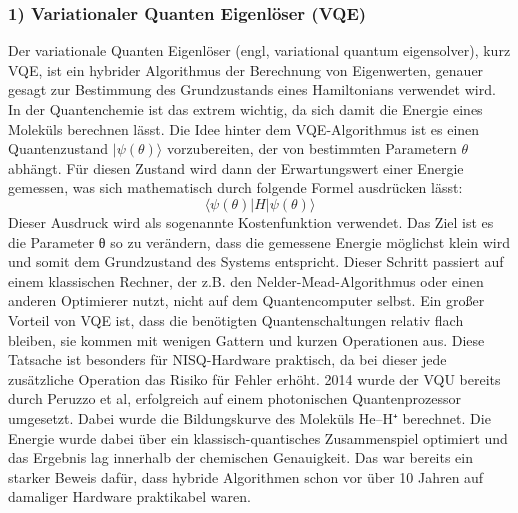\subsubsection*{1) Variationaler Quanten Eigenlöser (VQE)}
Der variationale Quanten Eigenlöser (engl, variational quantum eigensolver), kurz VQE, ist ein hybrider Algorithmus der Berechnung von Eigenwerten, genauer gesagt zur Bestimmung des Grundzustands eines Hamiltonians verwendet wird. In der Quantenchemie ist das extrem wichtig, da sich damit die Energie eines Moleküls berechnen lässt. Die Idee hinter dem VQE-Algorithmus ist es einen Quantenzustand $|\psi(\theta)\rangle$ vorzubereiten, der von bestimmten Parametern $\theta$ abhängt. Für diesen Zustand wird dann der Erwartungswert einer Energie gemessen, was sich mathematisch durch folgende Formel ausdrücken lässt:
$$
\langle\psi(\theta)|H|\psi(\theta)\rangle
$$
Dieser Ausdruck wird als sogenannte Kostenfunktion verwendet. Das Ziel ist es die Parameter θ so zu verändern, dass die gemessene Energie möglichst klein wird und somit dem Grundzustand des Systems entspricht. Dieser Schritt passiert auf einem klassischen Rechner, der z.B. den Nelder-Mead-Algorithmus oder einen anderen Optimierer nutzt, nicht auf dem Quantencomputer selbst. 
Ein großer Vorteil von VQE ist, dass die benötigten Quantenschaltungen relativ flach bleiben, sie kommen mit wenigen Gattern und kurzen Operationen aus. Diese Tatsache ist besonders für NISQ-Hardware praktisch, da bei dieser jede zusätzliche Operation das Risiko für Fehler erhöht. 
2014 wurde der VQU bereits durch Peruzzo et al, erfolgreich auf einem photonischen Quantenprozessor umgesetzt. Dabei wurde die Bildungskurve des Moleküls He–H⁺ berechnet. Die Energie wurde dabei über ein klassisch-quantisches Zusammenspiel optimiert und das Ergebnis lag innerhalb der chemischen Genauigkeit. Das war bereits ein starker Beweis dafür, dass hybride Algorithmen schon vor über 10 Jahren auf damaliger Hardware praktikabel waren. 

